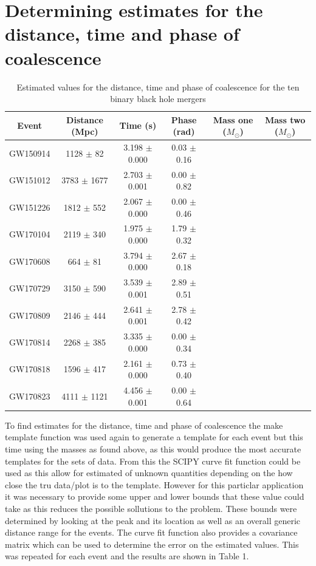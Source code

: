 \documentclass[]{article}
\begin{document}
\section*{Determining estimates for the distance, time and phase of coalescence}

\begin{table}[t]
\begin{center}
\begin{tabular}{|c c c c c c|}
\hline
Event & Distance (Mpc) & Time (s) & Phase (rad) & Mass one ($M_{\odot}$) & Mass two ($M_{\odot}$)\\
\hline
GW150914 & 1128 $\pm$ 82 & 3.198 $\pm$ 0.000 & 0.03 $\pm$ 0.16 & & \\
GW151012 & 3783 $\pm$ 1677 & 2.703 $\pm$ 0.001 & 0.00 $\pm$ 0.82 & &\\
GW151226 & 1812 $\pm$ 552 & 2.067 $\pm$ 0.000 & 0.00 $\pm$ 0.46 & &\\
GW170104 & 2119 $\pm$ 340 & 1.975 $\pm$ 0.000 & 1.79 $\pm$ 0.32 & &\\
GW170608 & 664 $\pm$ 81 & 3.794 $\pm$ 0.000 & 2.67 $\pm$ 0.18 & &\\
GW170729 & 3150 $\pm$ 590 & 3.539 $\pm$ 0.001 & 2.89 $\pm$ 0.51 & &\\
GW170809 & 2146 $\pm$ 444 & 2.641 $\pm$ 0.001 & 2.78 $\pm$ 0.42 & &\\
GW170814 & 2268 $\pm$ 385 & 3.335 $\pm$ 0.000 & 0.00 $\pm$ 0.34 & &\\
GW170818 & 1596 $\pm$ 417 & 2.161 $\pm$ 0.000 & 0.73 $\pm$ 0.40 & &\\
GW170823 & 4111 $\pm$ 1121 & 4.456 $\pm$ 0.001 & 0.00 $\pm$ 0.64 & &\\
\hline
\end{tabular}
\caption{Estimated values for the distance, time and phase of coalescence for the ten binary black hole mergers}
\label{tab:estimates}
\end{center}
\end{table}

To find estimates for the distance, time and phase of coalescence the make template function was used again
to generate a template for each event but this time using the masses as found above,
as this would produce the most accurate templates for the sets of data.
From this the SCIPY curve fit function could be used as this allow for estimated of unknown quantities depending on the
how close the tru data/plot is to the template. However for this particlar application
it was necessary to provide some upper and lower bounds that these value could take as this reduces the possible sollutions
to the problem. These bounds were determined by looking at the peak and its location as well as an overall generic distance range
for the events. The curve fit function also provides a covariance matrix which can be used to determine the error on the
estimated values. This was repeated for each event and the results are shown in Table 1.
\end{document}
